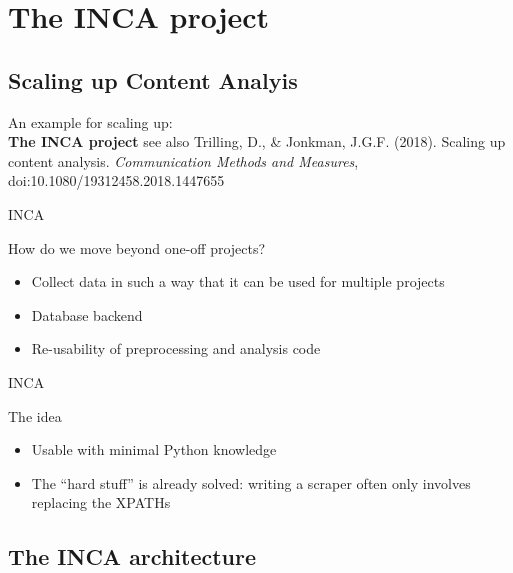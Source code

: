 \documentclass{beamer}
\begin{document}
\section{The INCA project}
\subsection{Scaling up Content Analyis}
\begin{frame}[plain]{}
An example for scaling up:\\
\textbf{The INCA project}
\vskip 3cm
\small{see also Trilling, D., \& Jonkman, J.G.F. (2018). Scaling up content analysis. \textit{Communication Methods and Measures}, doi:10.1080/19312458.2018.1447655}
\end{frame}



\begin{frame}[plain]
\end{frame}


\begin{frame}{INCA}
\begin{block}{How do we move beyond one-off projects?}
	\begin{itemize}
		\item Collect data in such a way that it can be used for multiple projects
		\item Database backend
		\item Re-usability of preprocessing and analysis code
	\end{itemize}
\end{block}
\end{frame}



\begin{frame}{INCA}
	\begin{block}{The idea}
		\begin{itemize}
		\item Usable with minimal Python knowledge
		\item The ``hard stuff'' is already solved: writing a scraper often only involves replacing the XPATHs
		\end{itemize}
	\end{block}
\end{frame}




\subsection{The INCA architecture}
\end{document}
